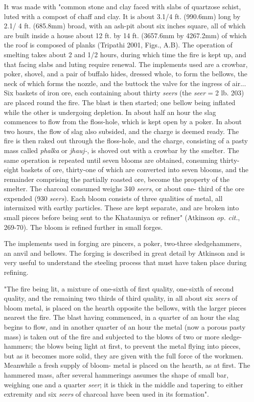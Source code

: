 It was made with "common stone and clay faced with slabs of quartzose schist, luted with a compost of chaff and clay. It is about 3.1/4 ft. (990.6mm) long by 2.1/ 4 ft. (685.8mm) broad, with an ash-pit about six inches square, all of which are built inside a house about 12 ft. by 14 ft. (3657.6mm by 4267.2mm) of which the roof is composed of planks (Tripathi 2001, Figs., A.B). The operation of smelting takes about 2 and 1/2 hours, during which time the fire is kept up, and that facing slabs and luting require renewal. The implements used are a crowbar, poker, shovel, and a pair of buffalo hides, dressed whole, to form the bellows, the neck of which forms the nozzle, and the buttock the valve for the ingress of air... Six baskets of iron ore, each containing about thirty {\it seers} (the {\it seer} = 2 lb. 203) are placed round the fire. The blast is then started; one bellow being inflated while the other is undergoing depletion. In about half an hour the slag commences to flow from the floss-hole, which is kept open by a poker. In about two hours, the flow of slag also subsided, and the charge is deemed ready. The fire is then raked out through the floss-hole, and the charge, consisting of a pasty mass called {\it phalka} or {\it jhauj-}, is shoved out with a crowbar by the smelter. The same operation is repeated until seven blooms are obtained, consuming thirty-eight baskets of ore, thirty-one of which are converted into seven blooms, and the remainder comprising the partially roasted ore, become the property of the smelter. The charcoal consumed weighs 340 {\it seers}, or about one- third of the ore expended (930 {\it seers}). Each bloom consists of three qualities of metal, all intermixed with earthy particles. These are kept separate, and are broken into small pieces before being sent to the Khatauniya or refiner" (Atkinson {\it op. cit.}, 269-70). The bloom is refined further in small forges.

The implements used in forging are pincers, a poker, two-three sledgehammers, an anvil and bellows. The forging is described in great detail by Atkinson and is very useful to understand the steeling process that must have taken place during refining.

"The fire being lit, a mixture of one-sixth of first quality, one-sixth of second quality, and the remaining two ­thirds of third quality, in all about six {\it seers} of bloom metal, is placed on the hearth opposite the bellows, with the larger pieces nearest the fire. The blast having commenced, in a quarter of an hour the slag begins to flow, and in another quarter of an hour the metal (now a porous pasty mass) is taken out of the fire and subjected to the blows of two or more sledge-hammers; the blows being light at first, to prevent the metal flying into pieces, but as it becomes more solid, they are given with the full force of the workmen. Meanwhile a fresh supply of bloom­- metal is placed on the hearth, as at first. The hammered mass, after several hammerings assumes the shape of small bar, weighing one and a quarter {\it seer}; it is thick in the middle and tapering to either extremity and six {\it seers} of charcoal have been used in its formation". 

